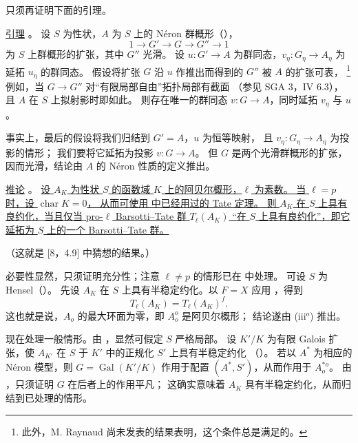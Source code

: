 只须再证明下面的引理。

\medskip
\noindent
\underline{引理} 。
设 $S$ 为性状，$A$ 为 $S$ 上的 N\'eron 群概形（），
\[
 1\longrightarrow G'\longrightarrow G\longrightarrow G''
 \longrightarrow1
\]
为 $S$ 上群概形的扩张，其中 $G''$ 光滑。
设 $u:G'\longrightarrow A$ 为群同态，$v_\eta:G_\eta\longrightarrow A_\eta$
为延拓 $u_\eta$ 的群同态。
假设将扩张 $G$ 沿 $u$ 作推出而得到的 $G''$ 被 $A$ 的扩张可表，
\footnote{此外，M. Raynaud 尚未发表的结果表明，这个条件总是满足的。}
例如，当 $G\longrightarrow G''$ 对“有限局部自由”拓扑局部有截面
（参见 SGA 3，IV 6.3），且 $A$ 在 $S$ 上拟射影时即如此。
则存在唯一的群同态 $v:G\longrightarrow A$，同时延拓 $v_\eta$ 与 $u$。

事实上，最后的假设将我们归结到 $G'=A$，$u$ 为恒等映射，
且 $v_\eta:G_\eta\longrightarrow A_\eta$ 为投影的情形；
我们要将它延拓为投影 $v:G\longrightarrow A$。
但 $G$ 是两个光滑群概形的扩张，因而光滑，结论由 $A$ 的 N\'eron 性质的定义推出。

\medskip
\noindent
\underline{推论} 。
\underline{设 $A_K$ 为性状 $S$ 的函数域 $K$ 上的阿贝尔概形，$\ell$ 为素数。
当 $\ell=p$ 时，设 $\operatorname{char}K=0$，
从而可使用  中已经用过的 Tate 定理。
则 $A_K$ 在 $S$ 上具有良约化，当且仅当 pro-$\ell$ Barsotti--Tate 群 $T_\ell(A_K)$
“在 $S$ 上具有良约化”，即它延拓为 $S$ 上的一个 Barsotti--Tate 群。}

（这就是 [8，4.9] 中猜想的结果。）

必要性显然，只须证明充分性；注意 $\ell\neq p$ 的情形已在  中处理。
可设 $S$ 为 Hensel（）。
先设 $A_K$ 在 $S$ 上具有半稳定约化。以 $F=X$ 应用 ，得到
\[
 T_\ell(A_K)=T_\ell(A_K)^f.
\]
这也就是说，$A_o$ 的最大环面为零，即 $A_o^o$ 是阿贝尔概形；
结论遂由  (iii${}^o$) 推出。

现在处理一般情形。由 ，显然可假定 $S$ 严格局部。
设 $K'/K$ 为有限 Galois 扩张，使 $A_{K'}$ 在 $S$ 于 $K'$ 中的正规化 $S'$ 上具有半稳定约化
（）。
若以 $A^*$ 为相应的 N\'eron 模型，则 $G=\operatorname{Gal}(K'/K)$ 作用于配置 $(A^*,S')$，从而作用于 $A_o^{*o}$。
由 ，只须证明 $G$ 在后者上的作用平凡；
这确实意味着 $A_K$ 具有半稳定约化，从而归结到已处理的情形。

